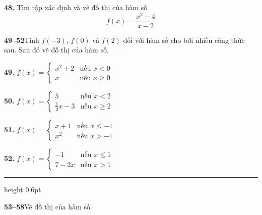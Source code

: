 \documentclass[10pt,letterpaper]{article}
\begin{document}
\begin{minipage}[t]{0.485\textwidth}
    \vspace{0.33em}
    \noindent
    \textbf{48.} Tìm tập xác định và vẽ đồ thị của hàm số
    \[
        f(x) = \frac{x^2 - 4}{x - 2}
    \]

    \vspace{0.33em}
    \noindent
    \textbf{\textsf{\color{stewartcyan}49--52}}\quad Tính $f(-3)$, $f(0)$ và $f(2)$ đối với hàm số cho bởi nhiều công thức sau. Sau đó vẽ đồ thị của hàm số.

    \vspace{0.33em}
    \noindent
    \begin{minipage}[t]{0.48\textwidth}
        \textbf{49.} $f(x) = \begin{cases}
            x^2 + 2 & \text{nếu } x < 0 \\
            x & \text{nếu } x \ge 0
        \end{cases}$
    \end{minipage}%
    \hfill
    \begin{minipage}[t]{0.48\textwidth}
        \textbf{50.} $f(x) = \begin{cases}
            5 & \text{nếu } x < 2 \\
            \frac{1}{2}x - 3 & \text{nếu } x \ge 2
        \end{cases}$
    \end{minipage}

    \vspace{0.49em}
    \noindent
    \begin{minipage}[t]{0.48\textwidth}
        \textbf{51.} $f(x) = \begin{cases}
            x + 1 & \text{nếu } x \le -1 \\
            x^2 & \text{nếu } x > -1
        \end{cases}$
    \end{minipage}%
    \hfill
    \begin{minipage}[t]{0.48\textwidth}
        \textbf{52.} $f(x) = \begin{cases}
            -1 & \text{nếu } x \le 1 \\
            7 - 2x & \text{nếu } x > 1
        \end{cases}$
    \end{minipage}

    \vspace{0.66em}
    {\color{stewartcyan}\hrule height 0.6pt}
    \vspace{0.49em}

    \noindent
    \textbf{\textsf{\color{stewartcyan}53--58}}\quad Vẽ đồ thị của hàm số.


\end{minipage}
\end{document}
